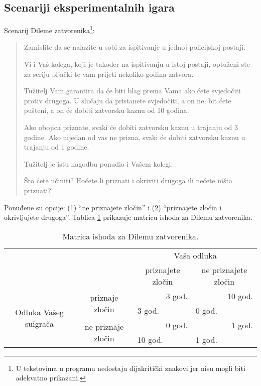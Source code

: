 \documentclass[a4paper, 12pt]{report}
\begin{document}
\makeatletter
{}
\makeatother
\begin{appendices}

\subsection{Scenariji eksperimentalnih igara}

Scenarij Dileme zatvorenika\footnote{U tekstovima u programu nedostaju dijakritički
    znakovi jer nisu mogli biti adekvatno prikazani.}: 
\begin{quote}
Zamislite da se nalazite u sobi za ispitivanje u jednoj policijskoj postaji.  

Vi i Vaš kolega, koji je također na ispitivanju u istoj postaji, optuženi ste
za seriju pljački te vam prijeti nekoliko godina zatvora. 

Tužitelj Vam garantira da će biti blag prema Vama ako ćete svjedočiti protiv
drugoga. U slučaju da pristanete svjedočiti, a on ne, bit ćete pušteni, a on će
dobiti zatvorsku kaznu od 10 godina.

Ako obojica priznate, svaki će dobiti zatvorsku kaznu u trajanju od 3 godine.
Ako nijedan od vas ne prizna, svaki će dobiti zatvorsku kaznu u trajanju od 1
godine.

Tužitelj je istu nagodbu ponudio i Vašem kolegi. 

Što ćete učiniti? Hoćete li priznati i okriviti drugoga ili nećete ništa priznati?
\end{quote}

Ponuđene su opcije: (1) \enquote{ne priznajete zločin} i (2) \enquote{priznajete
    zločin i okrivljujete drugoga}. Tablica \ref{pdtab} prikazuje matricu ishoda
za Dilemu zatvorenika. 

\begin{table}[!h]
    \centering
    \caption{Matrica ishoda za Dilemu zatvorenika. \label{pdtab}}
\begin{tabular}{cccc}
\toprule[1pt]
    & & \multicolumn{2}{c}{\textcolor{plava}{Vaša odluka}}\\
    \cmidrule[0.5pt]{3-4}
        & & priznajete zločin & ne priznajete zločin\\
        \multirow{4}{*}{\textcolor{zelena}{Odluka Vašeg suigrača}} & \multirow{2}{*}{priznaje
        zločin} & \multicolumn{1}{r}{\textcolor{plava}{3 god.}} &
    \multicolumn{1}{r}{\textcolor{plava}{10 god.}}\\
                 & & \multicolumn{1}{l}{\textcolor{zelena}{3 god.}} &
                 \multicolumn{1}{l}{\textcolor{zelena}{0 god.}}\\
        \cmidrule[0.5pt]{2-4}
        & \multirow{2}{*}{ne priznaje zločin} &
        \multicolumn{1}{r}{\textcolor{plava}{0 god.}} &
        \multicolumn{1}{r}{\textcolor{plava}{1 god.}}\\
        & & \multicolumn{1}{l}{\textcolor{zelena}{10 god.}} &
        \multicolumn{1}{l}{\textcolor{zelena}{1 god.}}\\
	\bottomrule[1pt]
\end{tabular}
\end{table}


\end{appendices}
\end{document}
